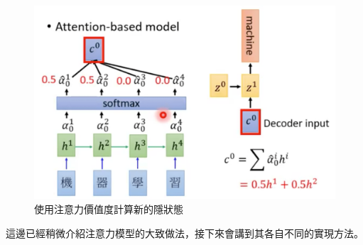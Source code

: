 \begin{figure}[htbp]
    \hfil
    \begin{minipage}[t]{0.45\textwidth}
        \includegraphics[width=\textwidth]{./figures/chapter02_method/attention-based_model2.png}
        \caption {使用注意力價值度計算新的隱狀態}
        \label{attention-based_model2}
    \end{minipage}
    \hfil
\end{figure}

這邊已經稍微介紹注意力模型的大致做法，接下來會講到其各自不同的實現方法。

